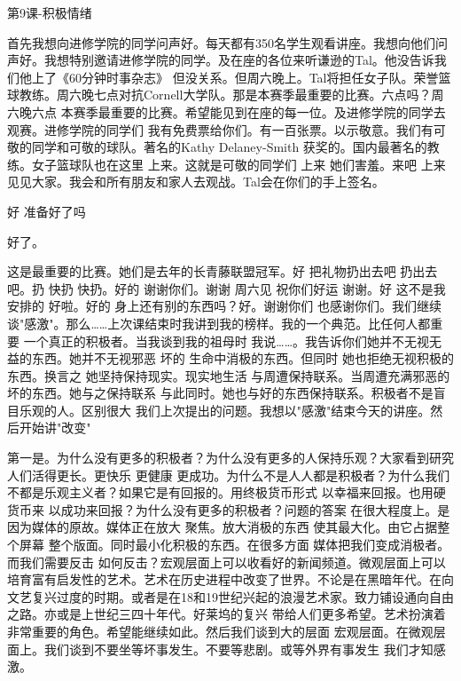 第9课-积极情绪 

首先我想向进修学院的同学问声好。每天都有350名学生观看讲座。我想向他们问声好。我想特别邀请进修学院的同学。及在座的各位来听谦逊的Tal。他没告诉我们他上了《60分钟时事杂志》 但没关系。但周六晚上。Tal将担任女子队。荣誉篮球教练。周六晚七点对抗Cornell大学队。那是本赛季最重要的比赛。六点吗？周六晚六点 本赛季最重要的比赛。希望能见到在座的每一位。及进修学院的同学去观赛。进修学院的同学们 我有免费票给你们。有一百张票。以示敬意。我们有可敬的同学和可敬的球队。著名的Kathy Delaney-Smith 获奖的。国内最著名的教练。女子篮球队也在这里 上来。这就是可敬的同学们 上来 她们害羞。来吧 上来 见见大家。我会和所有朋友和家人去观战。Tal会在你们的手上签名。 

好 准备好了吗 

好了。 

这是最重要的比赛。她们是去年的长青藤联盟冠军。好 把礼物扔出去吧 扔出去吧。扔 快扔 快扔。好的 谢谢你们。谢谢 周六见 祝你们好运 谢谢。好 这不是我安排的 好啦。好的 身上还有别的东西吗？好。谢谢你们 也感谢你们。我们继续谈"感激"。那么……上次课结束时我讲到我的榜样。我的一个典范。比任何人都重要 一个真正的积极者。当我谈到我的祖母时 我说……。我告诉你们她并不无视无益的东西。她并不无视邪恶 坏的 生命中消极的东西。但同时 她也拒绝无视积极的东西。换言之 她坚持保持现实。现实地生活 与周遭保持联系。当周遭充满邪恶的坏的东西。她与之保持联系 与此同时。她也与好的东西保持联系。积极者不是盲目乐观的人。区别很大 我们上次提出的问题。我想以"感激"结束今天的讲座。然后开始讲"改变" 

第一是。为什么没有更多的积极者？为什么没有更多的人保持乐观？大家看到研究 人们活得更长。更快乐 更健康 更成功。为什么不是人人都是积极者？为什么我们不都是乐观主义者？如果它是有回报的。用终极货币形式 以幸福来回报。也用硬货币来 以成功来回报？为什么没有更多的积极者？问题的答案 在很大程度上。是因为媒体的原故。媒体正在放大 聚焦。放大消极的东西 使其最大化。由它占据整个屏幕 整个版面。同时最小化积极的东西。在很多方面 媒体把我们变成消极者。而我们需要反击 如何反击？宏观层面上可以收看好的新闻频道。微观层面上可以培育富有启发性的艺术。艺术在历史进程中改变了世界。不论是在黑暗年代。在向文艺复兴过度的时期。或者是在18和19世纪兴起的浪漫艺术家。致力铺设通向自由之路。亦或是上世纪三四十年代。好莱坞的复兴 带给人们更多希望。艺术扮演着非常重要的角色。希望能继续如此。然后我们谈到大的层面 宏观层面。在微观层面上。我们谈到不要坐等坏事发生。不要等悲剧。或等外界有事发生 我们才知感激。 

